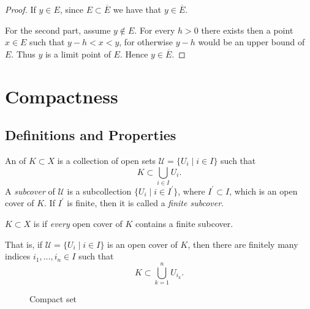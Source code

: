 \begin{proof}
If $y\in E$, since $E\subset\overline{E}$ we have that $y\in\overline{E}$.

For the second part, assume $y\notin E$. For every $h>0$ there exists then a point $x\in E$ such that $y-h<x<y$, for otherwise $y-h$ would be an upper bound of $E$. Thus $y$ is a limit point of $E$. Hence $y\in\overline{E}$.
\end{proof}
\pagebreak

\section{Compactness}
\subsection{Definitions and Properties}
\begin{definition}
An  of $K\subset X$ is a collection of open sets $\mathcal{U}=\{U_i\mid i\in I\}$ such that
\[K\subset\bigcup_{i\in I}U_i.\]
A \emph{subcover} of $\mathcal{U}$ is a subcollection $\{U_i\mid i\in I^\prime\}$, where $I^\prime\subset I$, which is an open cover of $K$. If $I^\prime$ is finite, then it is called a \emph{finite subcover}.
\end{definition}

\begin{definition}[Compactness]
$K\subset X$ is  if \emph{every} open cover of $K$ contains a finite subcover.
\end{definition}

That is, if $\mathcal{U}=\{U_i\mid i\in I\}$ is an open cover of $K$, then there are finitely many indices $i_1,\dots,i_n\in I$ such that
\[K\subset\bigcup_{k=1}^{n}U_{i_k}.\]

\begin{figure}[H]
\centering
{}
\caption{Compact set}
\end{figure}

